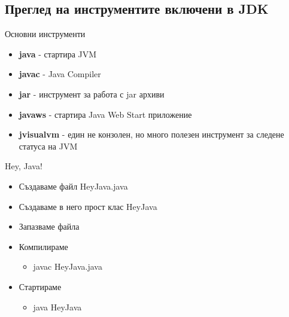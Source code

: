 \documentclass{beamer}
\begin{document}
\subsection{Преглед на инструментите включени в JDK}
\begin{frame}{Основни инструменти}
  \transdissolve  
  \begin{itemize}
    \item \textbf{java} - стартира JVM
    \item \textbf{javac} - Java Compiler
    \item \textbf{jar} - инструмент за работа с jar архиви
    \item \textbf{javaws} - стартира Java Web Start
    приложение
    \item \textbf{jvisualvm} - един не конзолен, но много
    полезен инструмент за следене статуса
    на JVM
  \end{itemize}
\end{frame}

\begin{frame}{Hey, Java!}
  \transdissolve  
  \begin{itemize}
    \item Създаваме файл HeyJava.java
    \item Създаваме в него прост клас HeyJava
    \item Запазваме файла
    \item Компилираме
      \begin{itemize}
        \item javac HeyJava.java
      \end{itemize}
    \item Стартираме
      \begin{itemize}
      \item java HeyJava
      \end{itemize}
  \end{itemize}
\end{frame}
\end{document}
